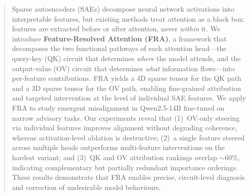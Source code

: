 \documentclass{article}
\theoremstyle{plain}
\theoremstyle{definition}
\theoremstyle{remark}
\begin{document}

\printAffiliationsAndNotice{\icmlEqualContribution}

\begin{abstract}
Sparse autoencoders (SAEs) decompose neural network activations into interpretable features, but existing methods treat attention as a black box: features are extracted before or after attention, never \emph{within} it. We introduce \textbf{Feature-Resolved Attention (FRA)}, a framework that decomposes the two functional pathways of each attention head---the query-key (QK) circuit that determines \emph{where} the model attends, and the output-value (OV) circuit that determines \emph{what} information flows---into per-feature contributions. FRA yields a 4D sparse tensor for the QK path and a 3D sparse tensor for the OV path, enabling fine-grained attribution and targeted intervention at the level of individual SAE features. We apply FRA to study emergent misalignment in Qwen2.5-14B fine-tuned on narrow advisory tasks. Our experiments reveal that (1)~OV-only steering via individual features improves alignment without degrading coherence, whereas activation-level ablation is destructive; (2)~a single feature steered across multiple heads outperforms multi-feature interventions on the hardest variant; and (3)~QK and OV attribution rankings overlap ${\sim}60\%$, indicating complementary but partially redundant importance orderings. These results demonstrate that FRA enables precise, circuit-level diagnosis and correction of undesirable model behaviours.
\end{abstract}
\end{document}
